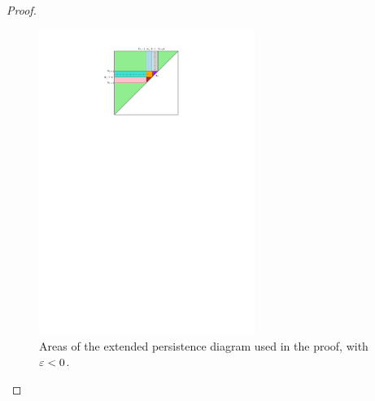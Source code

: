 \begin{proof}
\begin{figure}[h]
\begin{center}
\includegraphics[width=7cm]{figures/ShiftAreas}
\caption[Persistence measure for Shift]{\label{fig:areashift}
Areas of the extended persistence diagram used in the proof, with $\varepsilon <0$.
}
\end{center}
\end{figure}

\end{proof}







































